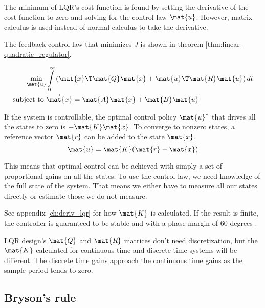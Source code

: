 The minimum of LQR's cost function is found by setting the derivative of the
cost function to zero and solving for the \gls{control law} $\mat{u}$. However,
matrix calculus is used instead of normal calculus to take the derivative.

The feedback \gls{control law} that minimizes $J$ is shown in theorem
\ref{thm:linear-quadratic_regulator}.
\begin{theorem}
  \label{thm:linear-quadratic_regulator}
  \begin{align}
    \min_{\mat{u}} &\int\limits_0^\infty \left(\mat{x}\T\mat{Q}\mat{x} +
      \mat{u}\T\mat{R}\mat{u}\right) dt \nonumber \\
    \text{subject to } &\dot{\mat{x}} = \mat{A}\mat{x} + \mat{B}\mat{u}
  \end{align}

  If the \gls{system} is controllable, the optimal control policy $\mat{u}^*$
  that drives all the \glspl{state} to zero is $-\mat{K}\mat{x}$. To converge to
  nonzero \glspl{state}, a \gls{reference} vector $\mat{r}$ can be added to the
  \gls{state} $\mat{x}$.
  \begin{equation}
    \mat{u} = \mat{K}(\mat{r} - \mat{x})
  \end{equation}
\end{theorem}

This means that optimal control can be achieved with simply a set of
proportional gains on all the \glspl{state}. To use the \gls{control law}, we
need knowledge of the full \gls{state} of the \gls{system}. That means we either
have to measure all our \glspl{state} directly or estimate those we do not
measure.

See appendix \ref{ch:deriv_lqr} for how $\mat{K}$ is calculated. If the result
is finite, the controller is guaranteed to be stable and
 with a \gls{phase margin} of 60 degrees
\cite{bib:lqr_phase_margin}.
\begin{remark}
  LQR design's $\mat{Q}$ and $\mat{R}$ matrices don't need \gls{discretization},
  but the $\mat{K}$ calculated for continuous time and discrete time
  \glspl{system} will be different. The discrete time gains approach the
  continuous time gains as the sample period tends to zero.
\end{remark}

\subsection{Bryson's rule}

